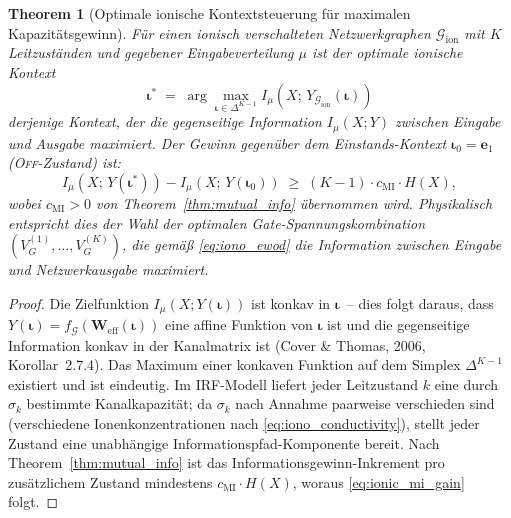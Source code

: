 \documentclass[12pt, a4paper, openany]{report}
\newtheorem{theorem}{Theorem}[chapter]
\newcommand{\calG}{\mathcal{G}}
\begin{document}
\begin{theorem}[Optimale ionische Kontextsteuerung für maximalen Kapazitätsgewinn]
\label{thm:ionic_optimal_context}
Für einen ionisch verschalteten Netzwerkgraphen $\calG_{\mathrm{ion}}$
mit $K$ Leitzuständen und gegebener Eingabeverteilung $\mu$ ist der
optimale ionische Kontext
\begin{equation}
  \label{eq:ionic_optimal}
  \bm{\iota}^*
  \;=\; \arg\max_{\bm{\iota} \in \Delta^{K-1}} I_\mu(X;\, Y_{\calG_{\mathrm{ion}}}(\bm{\iota}))
\end{equation}
derjenige Kontext, der die gegenseitige Information $I_\mu(X; Y)$ zwischen
Eingabe und Ausgabe maximiert.  Der Gewinn gegenüber dem
Einstands-Kontext $\bm{\iota}_0 = \bm{e}_1$ (\textsc{Off}-Zustand) ist:
\begin{equation}
  \label{eq:ionic_mi_gain}
  I_\mu(X;\, Y(\bm{\iota}^*)) - I_\mu(X;\, Y(\bm{\iota}_0))
  \;\geq\;
  (K-1)\cdot c_{\mathrm{MI}} \cdot H(X),
\end{equation}
wobei $c_{\mathrm{MI}} > 0$ von Theorem~\ref{thm:mutual_info} übernommen wird.
Physikalisch entspricht dies der Wahl der optimalen Gate-Spannungs\-kombination
$(V_G^{(1)}, \ldots, V_G^{(K)})$, die gemäß \eqref{eq:iono_ewod} die
Information zwischen Eingabe und Netzwerkausgabe maximiert.
\end{theorem}

\begin{proof}
Die Zielfunktion $I_\mu(X; Y(\bm{\iota}))$ ist konkav in $\bm{\iota}$~--
dies folgt daraus, dass $Y(\bm{\iota}) = f_{\calG}(\bm{W}_{\mathrm{eff}}(\bm{\iota}))$
eine affine Funktion von $\bm{\iota}$ ist und die gegenseitige Information
konkav in der Kanalmatrix ist (Cover \& Thomas, 2006, Korollar~2.7.4).
Das Maximum einer konkaven Funktion auf dem Simplex $\Delta^{K-1}$ existiert
und ist eindeutig.  Im IRF-Modell liefert jeder Leitzustand $k$ eine durch
$\sigma_k$ bestimmte Kanalkapazität; da $\sigma_k$ nach Annahme paarweise
verschieden sind (verschiedene Ionenkonzentrationen nach
\eqref{eq:iono_conductivity}), stellt jeder Zustand eine unabhängige
Informationspfad-Komponente bereit.  Nach Theorem~\ref{thm:mutual_info}
ist das Informationsgewinn-Inkrement pro zusätzlichem Zustand mindestens
$c_{\mathrm{MI}} \cdot H(X)$, woraus \eqref{eq:ionic_mi_gain} folgt.
\end{proof}
\end{document}

